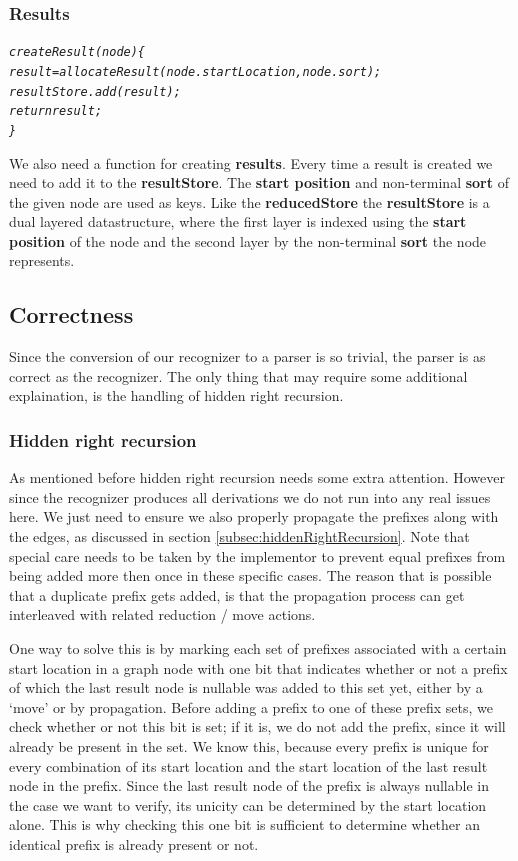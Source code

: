 \documentclass[a4paper,10pt]{article}
\begin{document}
\pagebreak
\subsubsection{Results}
{\small
\begin{alltt}
\textit{createResult(node)\{
  result = allocateResult(node.startLocation, node.sort);
  resultStore.add(result);
  return result;
\}}
\end{alltt}
}

We also need a function for creating {\bf results}. Every time a result is created we need to add it to the {\bf resultStore}. The {\bf start position} and non-terminal {\bf sort} of the given node are used as keys. Like the {\bf reducedStore} the {\bf resultStore} is a dual layered datastructure, where the first layer is indexed using the {\bf start position} of the node and the second layer by the non-terminal {\bf sort} the node represents.

\subsection{Correctness}
\label{sec:parserCorrectness}

Since the conversion of our recognizer to a parser is so trivial, the parser is as correct as the recognizer. The only thing that may require some additional explaination, is the handling of hidden right recursion.

\subsubsection{Hidden right recursion}
As mentioned before hidden right recursion needs some extra attention. However since the recognizer produces all derivations we do not run into any real issues here. We just need to ensure we also properly propagate the prefixes along with the edges, as discussed in section \ref{subsec:hiddenRightRecursion}. Note that special care needs to be taken by the implementor to prevent equal prefixes from being added more then once in these specific cases. The reason that is possible that a duplicate prefix gets added, is that the propagation process can get interleaved with related reduction / move actions.

One way to solve this is by marking each set of prefixes associated with a certain start location in a graph node with one bit that indicates whether or not a prefix of which the last result node is nullable was added to this set yet, either by a `move' or by propagation. Before adding a prefix to one of these prefix sets, we check whether or not this bit is set; if it is, we do not add the prefix, since it will already be present in the set. We know this, because every prefix is unique for every combination of its start location and the start location of the last result node in the prefix. Since the last result node of the prefix is always nullable in the case we want to verify, its unicity can be determined by the start location alone. This is why checking this one bit is sufficient to determine whether an identical prefix is already present or not.
\end{document}
